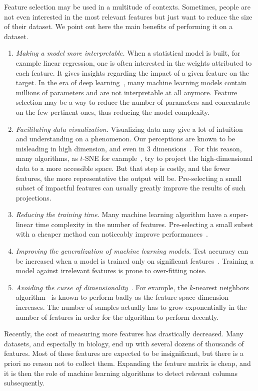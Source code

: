 Feature selection may be used in a multitude of contexts.
Sometimes, people are not even interested in the most relevant features
but just want to reduce the size of their dataset.
We point out here the main benefits of performing it on a dataset.
\begin{enumerate}
    \item \textit{Making a model more interpretable.}
    When a statistical model is built, for example linear regression,
    one is often interested in the weights attributed to each feature.
    It gives insights regarding the impact of a given feature on the target.
    In the era of deep learning~\citep{deep_learning},
    many machine learning models contain millions of parameters and are not interpretable at all anymore.
    Feature selection may be a way to reduce the number of parameters and concentrate on the few pertinent ones,
    thus reducing the model complexity.
    \item \textit{Facilitating data visualization.}
    Visualizing data may give a lot of intuition and understanding on a phenomenon.
    Our perceptions are known to be misleading in high dimension,
    and even in 3 dimensions~\citep{graphical_perception}.
    For this reason, many algorithms, as $t$-SNE for example~\citep{t_sne},
    try to project the high-dimensional data to a more accessible space.
    But that step is costly, and the fewer features, the more representative the output will be.
    Pre-selecting a small subset of impactful features can usually greatly improve the results of such projections.
    \item \textit{Reducing the training time.}
    Many machine learning algorithm have a super-linear time complexity in the number of features.
    Pre-selecting a small subset with a cheaper method
    can noticeably improve performances~\citep{high_dimensional_fs}.
    \item \textit{Improving the generalization of machine learning models.}
    Test accuracy can be increased when a model is trained only on significant features~\citep{fs_overfit}.
    Training a model against irrelevant features is prone to over-fitting noise.
    \item \textit{Avoiding the curse of dimensionality}~\citep{curse_dimensionality}.
    For example, the $k$-nearest neighbors algorithm~\citep{knn} is known to perform badly as the feature space
    dimension increases.
    The number of samples actually has to grow exponentially in the number of features in order for the algorithm
    to perform decently.
\end{enumerate}
Recently, the cost of measuring more features has drastically decreased.
Many datasets, and especially in biology, end up with several dozens of thousands of features.
Most of these features are expected to be insignificant, but there is a priori no reason not to collect them.
Expanding the feature matrix is cheap, and it is then the role of machine learning algorithms
to detect relevant columns subsequently.

